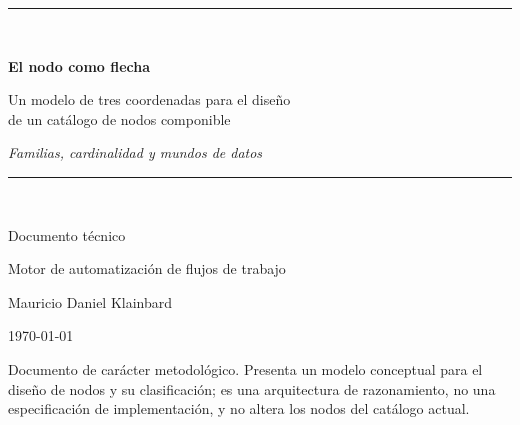\documentclass[11pt,a4paper]{article}
\theoremstyle{definition}
\theoremstyle{plain}
\begin{document}
\begin{titlepage}
\centering
\vspace*{1.5cm}

{\color{synapseCyan}\rule{\linewidth}{1.2pt}}\\[0.5cm]

{\Huge\bfseries El nodo como flecha\par}
\vspace{0.4cm}
{\LARGE Un modelo de tres coordenadas para el diseño\\ de un catálogo de nodos componible\par}
\vspace{0.3cm}
{\large\itshape Familias, cardinalidad y mundos de datos\par}

\vspace{0.4cm}
{\color{synapseCyan}\rule{\linewidth}{1.2pt}}\\[1.6cm]

{\large Documento técnico\par}
\vspace{0.2cm}
{\normalsize Motor de automatización de flujos de trabajo\par}

\vfill

{\large Mauricio Daniel Klainbard\par}
\vspace{0.3cm}
{\normalsize\today\par}
\vspace{1.2cm}

{\footnotesize
Documento de carácter metodológico. Presenta un modelo conceptual para el diseño
de nodos y su clasificación; es una arquitectura de razonamiento, no una
especificación de implementación, y no altera los nodos del catálogo actual.\par}

\end{titlepage}
\end{document}
